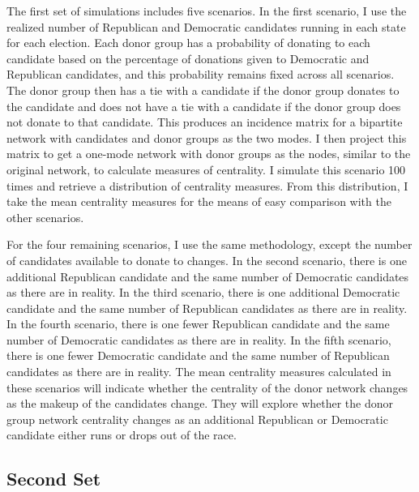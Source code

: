 \documentclass[]{article}
\begin{document}
The first set of simulations includes five scenarios. In the first
scenario, I use the realized number of Republican and Democratic
candidates running in each state for each election. Each donor group has
a probability of donating to each candidate based on the percentage of
donations given to Democratic and Republican candidates, and this
probability remains fixed across all scenarios. The donor group then has
a tie with a candidate if the donor group donates to the candidate and
does not have a tie with a candidate if the donor group does not donate
to that candidate. This produces an incidence matrix for a bipartite
network with candidates and donor groups as the two modes. I then
project this matrix to get a one-mode network with donor groups as the
nodes, similar to the original network, to calculate measures of
centrality. I simulate this scenario 100 times and retrieve a
distribution of centrality measures. From this distribution, I take the
mean centrality measures for the means of easy comparison with the other
scenarios.

For the four remaining scenarios, I use the same methodology, except the
number of candidates available to donate to changes. In the second
scenario, there is one additional Republican candidate and the same
number of Democratic candidates as there are in reality. In the third
scenario, there is one additional Democratic candidate and the same
number of Republican candidates as there are in reality. In the fourth
scenario, there is one fewer Republican candidate and the same number of
Democratic candidates as there are in reality. In the fifth scenario,
there is one fewer Democratic candidate and the same number of
Republican candidates as there are in reality. The mean centrality
measures calculated in these scenarios will indicate whether the
centrality of the donor network changes as the makeup of the candidates
change. They will explore whether the donor group network centrality
changes as an additional Republican or Democratic candidate either runs
or drops out of the race.

\subsection{Second Set}\label{second-set}
\end{document}
